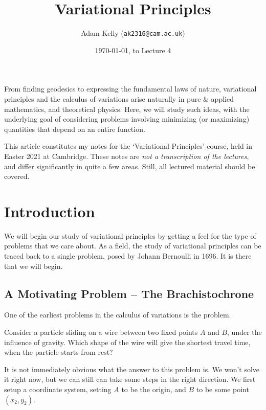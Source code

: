 \documentclass[a4paper]{scrartcl}
\title{Variational Principles}
\author{Adam Kelly (\texttt{ak2316@cam.ac.uk})}
\date{\today, to Lecture 4}
\begin{document}
\maketitle

From finding geodesics to expressing the fundamental laws of nature, variational principles and the calculus of variations arise naturally in pure \& applied mathematics, and theoretical physics.
Here, we will study such ideas, with the underlying goal of considering problems involving minimizing (or maximizing) quantities that depend on an entire function. 

This article constitutes my notes for the `Variational Principles' course, held in Easter 2021 at Cambridge. These notes are \emph{not a transcription of the lectures}, and differ significantly in quite a few areas. Still, all lectured material should be covered.


\tableofcontents

\section{Introduction}



We will begin our study of variational principles by getting a feel for the type of problems that we care about. 
As a field, the study of variational principles can be traced back to a single problem, posed by Johann Bernoulli in 1696. It is there that we will begin.

\subsection{A Motivating Problem -- The Brachistochrone}

One of the earliest problems in the calculus of variations is the  problem.

\begin{example}[Brachistochrone]
	Consider a particle sliding on a wire between two fixed points $A$ and $B$, under the influence of gravity. Which shape of the wire will give the shortest travel time, when the particle starts from rest?
\end{example}

It is not immediately obvious what the answer to this problem is. We won't solve it right now, but we can still can take some steps in the right direction. We first setup a coordinate system, setting $A$ to be the origin, and $B$ to be some point $(x_2, y_2)$.
\end{document}
